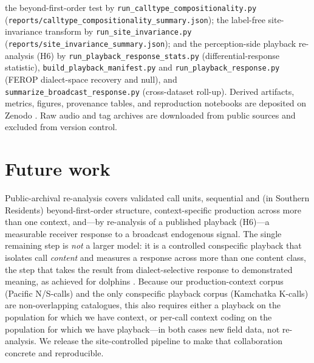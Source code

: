 \documentclass[11pt]{article}
\begin{document}
the beyond-first-order test by \texttt{run\_calltype\_compositionality.py}
(\texttt{reports/calltype\_compositionality\_summary.json}); the label-free site-invariance
transform by \texttt{run\_site\_invariance.py} (\texttt{reports/site\_invariance\_summary.json});
and the perception-side playback re-analysis (H6) by \texttt{run\_playback\_response\_stats.py}
(differential-response statistic), \texttt{build\_playback\_manifest.py} and
\texttt{run\_playback\_response.py} (FEROP dialect-space recovery and null), and
\texttt{summarize\_broadcast\_response.py} (cross-dataset roll-up). Derived artifacts,
metrics, figures, provenance tables, and reproduction notebooks are deposited on Zenodo
\citep{orcadolittle_zenodo}. Raw audio and tag archives are downloaded from public sources
and excluded from version control.

\section{Future work}
Public-archival re-analysis covers validated call units,
sequential and (in Southern Residents) beyond-first-order structure, context-specific
production across more than one context, and---by re-analysis of a published playback (H6)---a
measurable receiver response to a broadcast endogenous signal. The single remaining step is
\emph{not} a larger model: it is a controlled conspecific playback that isolates call
\emph{content} and measures a response across more than one content class, the step that takes
the result from dialect-selective response to demonstrated meaning, as achieved for dolphins
\citep{sayigh2025nsw,deecke2005}. Because our production-context corpus (Pacific N/S-calls) and
the only conspecific playback corpus (Kamchatka K-calls) are non-overlapping catalogues, this
also requires either a playback on the population for which we have context, or per-call
context coding on the population for which we have playback---in both cases new field data, not
re-analysis. We release the site-controlled pipeline to make that collaboration concrete and
reproducible.



\end{document}

